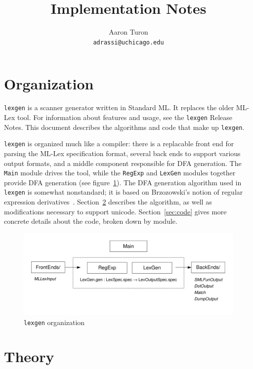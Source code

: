 \documentclass[11pt]{article}
\title{\flex{} Implementation Notes}
\author{Aaron Turon\\
\texttt{adrassi@uchicago.edu}}
\newcommand{\flex}{\texttt{lexgen}}
\newcommand{\nm}[1]{\texttt{#1}}
\begin{document}
\maketitle
\tableofcontents

\newpage
\section{Organization}

\flex{} is a scanner generator written in Standard ML.  It replaces the older
ML-Lex tool.  For information about features and usage, see the \flex{} 
Release Notes.  This document describes the algorithms and code that make up
\flex{}.

\flex{} is organized much like a compiler: there is a replacable front end for
parsing the ML-Lex specification format, several back ends to support various
output formats, and a middle component responsible for DFA generation.  The
\nm{Main} module drives the tool, while the \nm{RegExp} and \nm{LexGen} modules
together provide DFA generation (see figure~\ref{fig:ml-flex}).  The DFA
generation algorithm used in \flex{} is somewhat nonstandard; it is based on
Brzozowski's notion of regular expression derivatives~\cite{derivatives}. 
Section~\ref{sec:theory} describes the algorithm, as well as modifications
necessary to support unicode.  Section~\ref{sec:code} gives more concrete
details about the code, broken down by module.

\begin{figure}\label{fig:ml-flex}
\begin{center}
\ifpdf
  \includegraphics[scale=0.8]{impl-pic.pdf}
\fi
\end{center}
\caption{\flex{} organization}
\end{figure}

\newpage
\section{Theory}\label{sec:theory}
\end{document}
